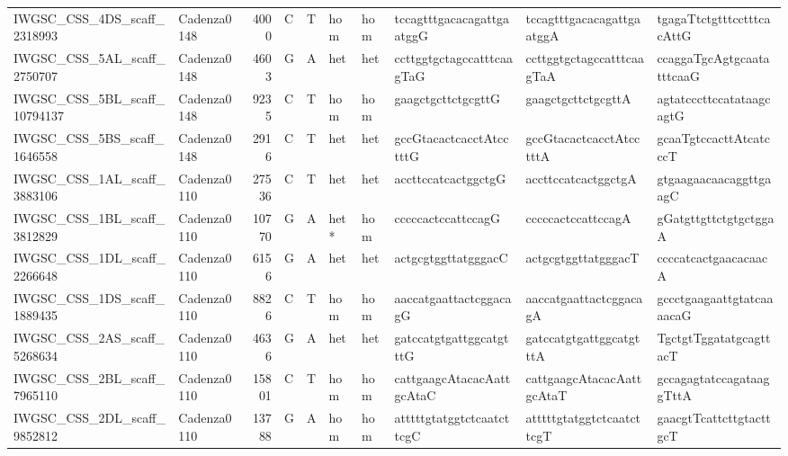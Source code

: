 \begin{longtable}{llrlllllll}
 IWGSC\_CSS\_4DS\_scaff\_2318993  & Cadenza0148 &       4000 & C         & T        & hom            & hom         & tccagtttgacacagattgaatggG & tccagtttgacacagattgaatggA & tgagaTtctgtttcctttcacAttG \\
 IWGSC\_CSS\_5AL\_scaff\_2750707  & Cadenza0148 &       4603 & G         & A        & het            & het         & ccttggtgctagccatttcaagTaG & ccttggtgctagccatttcaagTaA & ccaggaTgcAgtgcaatatttcaaG \\
 IWGSC\_CSS\_5BL\_scaff\_10794137 & Cadenza0148 &       9235 & C         & T        & hom            & hom         & gaagctgcttctgcgttG        & gaagctgcttctgcgttA        & agtatcccttccatataagcagtG  \\
 IWGSC\_CSS\_5BS\_scaff\_1646558  & Cadenza0148 &       2916 & C         & T        & het            & het         & gccGtacactcacctAtcctttG   & gccGtacactcacctAtcctttA   & gcaaTgtccacttAtcatcccT    \\
 IWGSC\_CSS\_1AL\_scaff\_3883106  & Cadenza0110 &      27536 & C         & T        & het            & het         & accttccatcactggctgG       & accttccatcactggctgA       & gtgaagaacaacaggttgaagC    \\
 IWGSC\_CSS\_1BL\_scaff\_3812829  & Cadenza0110 &      10770 & G         & A        & het*           & hom         & cccccactccattccagG        & cccccactccattccagA        & gGatgttgttctgtgctggaA     \\
 IWGSC\_CSS\_1DL\_scaff\_2266648  & Cadenza0110 &       6156 & G         & A        & het            & het         & actgcgtggttatgggacC       & actgcgtggttatgggacT       & ccccatcactgaacacaacA      \\
 IWGSC\_CSS\_1DS\_scaff\_1889435  & Cadenza0110 &       8826 & C         & T        & hom            & hom         & aaccatgaattactcggacagG    & aaccatgaattactcggacagA    & gccctgaagaattgtatcaaaacaG \\
 IWGSC\_CSS\_2AS\_scaff\_5268634  & Cadenza0110 &       4636 & G         & A        & het            & het         & gatccatgtgattggcatgtttG   & gatccatgtgattggcatgtttA   & TgctgtTggatatgcagttacT    \\
 IWGSC\_CSS\_2BL\_scaff\_7965110  & Cadenza0110 &      15801 & C         & T        & hom            & hom         & cattgaagcAtacacAattgcAtaC & cattgaagcAtacacAattgcAtaT & gccagagtatccagataaggTttA  \\
 IWGSC\_CSS\_2DL\_scaff\_9852812  & Cadenza0110 &      13788 & G         & A        & hom            & hom         & atttttgtatggtctcaatcttcgC & atttttgtatggtctcaatcttcgT & gaacgtTcattcttgtacttgcT   \\

\end{longtable}
